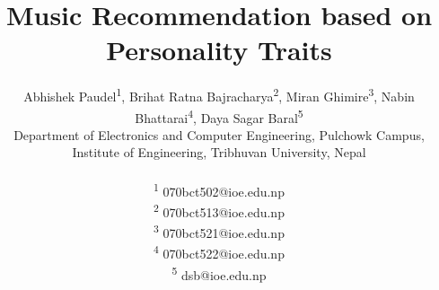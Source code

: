 \documentclass[journal]{IEEEtran}
\begin{document}
%
\title{Music Recommendation based on Personality Traits}



%
%

\author {Abhishek Paudel\textsuperscript{1}, Brihat Ratna Bajracharya\textsuperscript{2}, Miran Ghimire\textsuperscript{3}, Nabin Bhattarai\textsuperscript{4}, Daya Sagar Baral\textsuperscript{5}


Department of Electronics and Computer Engineering, Pulchowk Campus,\\
Institute of Engineering, Tribhuvan University, Nepal
\\
\\  \textsuperscript{1} 070bct502@ioe.edu.np
\\  \textsuperscript{2} 070bct513@ioe.edu.np
\\  \textsuperscript{3} 070bct521@ioe.edu.np
\\  \textsuperscript{4} 070bct522@ioe.edu.np
\\  \textsuperscript{5} dsb@ioe.edu.np
}

% 
%
\end{document}
